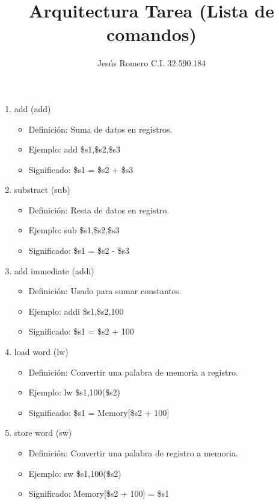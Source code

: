 \documentclass{article}
\title{Arquitectura Tarea (Lista de comandos)}
\author{Jesús Romero  C.I. 32.590.184}
\begin{document}
\maketitle


\begin{enumerate}

    \item add (add)
    \begin{itemize}
        \item Definición: Suma de datos en registros.
        \item Ejemplo: add \$s1,\$s2,\$s3
        \item Significado: \$s1 = \$s2 + \$s3
    \end{itemize}
    
    \item substract (sub)
    \begin{itemize}
        \item Definición: Resta de datos en registro.
        \item Ejemplo: sub \$s1,\$s2,\$s3
        \item Significado: \$s1 = \$s2 - \$s3
    \end{itemize}

    \item add immediate (addi)
    \begin{itemize}
        \item Definición: Usado para sumar constantes.
        \item Ejemplo: addi \$s1,\$s2,100
        \item Significado: \$s1 = \$s2 + 100
    \end{itemize}

    \item load word (lw)
    \begin{itemize}
        \item Definición: Convertir una palabra de memoria a registro.
        \item Ejemplo: lw \$s1,100(\$s2)
        \item Significado: \$s1 = Memory[\$s2 + 100]
    \end{itemize}

    \item store word (sw)
    \begin{itemize}
        \item Definición: Convertir una palabra de registro a memoria.
        \item Ejemplo: sw \$s1,100(\$s2)
        \item Significado: Memory[\$s2 + 100] = \$s1
    \end{itemize}
    

\end{enumerate}
\end{document}

